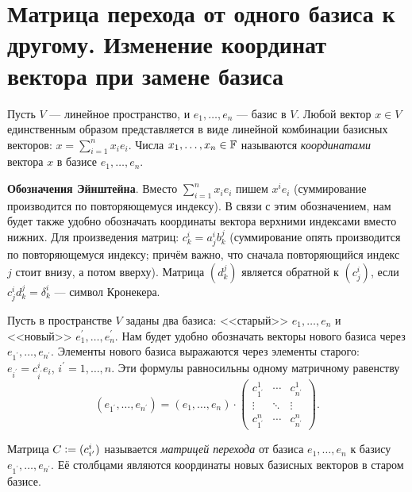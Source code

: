 \section{Матрица перехода от одного базиса к другому. Изменение координат вектора при замене базиса}

\begin{definition}
    Пусть $V$ --- линейное пространство, и $e_1, \ldots, e_n$ --- базис в $V$. Любой вектор $x \in V$ единственным образом представляется в виде линейной комбинации базисных векторов: $x = \sum\limits_{i = 1}^nx_ie_i$. Числа $x_1, \ldots, x_n \in \mathbb{F}$ называются \textit{координатами} вектора $x$ в базисе $e_1, \ldots, e_n$.
\end{definition}

\textbf{Обозначения Эйнштейна}. Вместо $\sum\limits_{i = 1}^nx_ie_i$ пишем $x^ie_i$ (суммирование производится по повторяющемуся индексу). В связи с этим обозначением, нам будет также удобно обозначать координаты вектора верхними индексами вместо нижних. Для произведения матриц: $c^i_k = a^i_jb^j_k$ (суммирование опять производится по повторяющемуся индексу; причём важно, что сначала повторяющийся индекс $j$ стоит внизу, а потом вверху). Матрица $(d^j_k)$ является обратной к $(c^i_j)$, если $c^i_jd^j_k = \delta^i_k$ --- символ Кронекера.

Пусть в пространстве $V$ заданы два базиса: <<старый>> $e_1, \ldots, e_n$ и <<новый>> $e^\prime_1, \ldots, e^\prime_n$. Нам будет удобно обозначать векторы нового базиса через $e_{1^\prime}, \ldots, e_{n^\prime}$. Элементы нового базиса выражаются через элементы старого: $e_{i^\prime} = c^i_{i^\prime}e_i$, $i^\prime = 1, \ldots, n$. Эти формулы равносильны одному матричному равенству
\[
    (e_{1^\prime}, \ldots, e_{n^\prime}) = (e_1, \ldots, e_n) \cdot
    \begin{pmatrix}
        c^1_{1^\prime} & \cdots & c^1_{n^\prime}\\
        \vdots & \ddots & \vdots\\
        c^n_{1^\prime} & \cdots & c^n_{n^\prime}
    \end{pmatrix}.
\]

\begin{definition}
    Матрица $C \vcentcolon = (c^i_{i^\prime})$ называется \textit{матрицей перехода} от базиса $e_1, \ldots, e_n$ к базису $e_{1^\prime}, \ldots, e_{n^\prime}$. Её столбцами являются координаты новых базисных векторов в старом базисе.
\end{definition}

